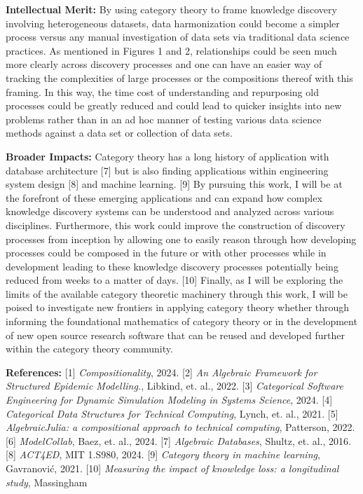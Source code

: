 \documentclass[11pt]{extarticle}
\begin{document}
\textbf{Intellectual Merit:} By using category theory to frame knowledge discovery involving heterogeneous datasets, data harmonization could become a simpler process versus any manual investigation of data sets via traditional data science practices.
As mentioned in Figures 1 and 2, relationships could be seen much more clearly across discovery processes and one can have an easier way of tracking the complexities of large processes or the compositions thereof with this framing.
In this way, the time cost of understanding and repurposing old processes could be greatly reduced and could lead to quicker insights into new problems rather than in an ad hoc manner of testing various data science methods against a data set or collection of data sets.

\textbf{Broader Impacts:} Category theory has a long history of application with database architecture [7] but is also finding applications within engineering system design [8] and machine learning. [9]
By pursuing this work, I will be at the forefront of these emerging applications and can expand how complex knowledge discovery systems can be understood and analyzed across various disciplines.
Furthermore, this work could improve the construction of discovery processes from inception by allowing one to easily reason through how developing processes could be composed in the future or with other processes while in development leading to these knowledge discovery processes potentially being reduced from weeks to a matter of days. [10]
Finally, as I will be exploring the limits of the available category theoretic machinery through this work, I will be poised to investigate new frontiers in applying category theory whether through informing the foundational mathematics of category theory or in the development of new open source research software that can be reused and developed further within the category theory community.

\textbf{References:} [1] \textit{Compositionality}, 2024. [2] \textit{An Algebraic Framework for Structured Epidemic Modelling.}, Libkind, et. al., 2022. [3] \textit{Categorical Software Engineering for Dynamic Simulation Modeling in Systems Science}, 2024. [4] \textit{Categorical Data Structures for Technical Computing}, Lynch, et. al., 2021. [5] \textit{AlgebraicJulia: a compositional approach to technical computing}, Patterson, 2022. [6] \textit{ModelCollab}, Baez, et. al., 2024. [7] \textit{Algebraic Databases}, Shultz, et. al., 2016. [8] \textit{ACT4ED}, MIT 1.S980, 2024. [9] \textit{Category theory in machine learning}, Gavranović, 2021. [10] \textit{Measuring the impact of knowledge loss: a longitudinal study}, Massingham
\end{document}
